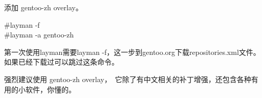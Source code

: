 \begin{example}{添加 gentoo-zh overlay。}
\begin{code}
\#layman -f \\
\#layman -a gentoo-zh
\end{code}

第一次使用layman需要layman -f，这一步到gentoo.org下载repositories.xml文件。如果已经下载过可以跳过这条命令。

强烈建议使用 gentoo-zh overlay，　它除了有中文相关的补丁增强，还包含各种有用的小软件，你懂的。

\end{example}
